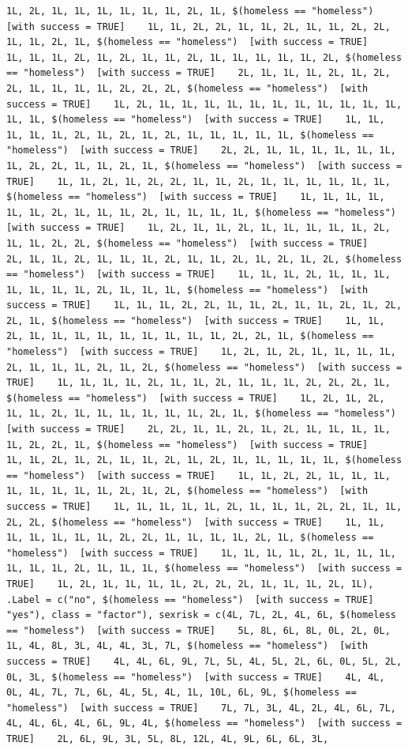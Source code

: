 \documentclass{tufte-book}\usepackage[]{graphicx}\usepackage[]{xcolor}
\makeatletter
\newenvironment{kframe}{%
 \def\at@end@of@kframe{}%
 \ifinner\ifhmode%
  \def\at@end@of@kframe{\end{minipage}}%
  \begin{minipage}{\columnwidth}%
 \fi\fi%
 \def\FrameCommand##1{\hskip\@totalleftmargin \hskip-\fboxsep
 \colorbox{shadecolor}{##1}\hskip-\fboxsep
     \hskip-\linewidth \hskip-\@totalleftmargin \hskip\columnwidth}%
 \MakeFramed {\advance\hsize-\width
   \@totalleftmargin\z@ \linewidth\hsize
   \@setminipage}}%
 {\par\unskip\endMakeFramed%
 \at@end@of@kframe}
\newenvironment{knitrout}{}{} %
\makeatother
\begin{document}
\begin{knitrout}
\begin{kframe}
\begin{verbatim}
1L, 2L, 1L, 1L, 1L, 1L, 1L, 1L, 2L, 1L, $(homeless == "homeless")  [with success = TRUE]    1L, 1L, 2L, 2L, 1L, 1L, 2L, 1L, 1L, 2L, 2L, 1L, 1L, 2L, 1L, $(homeless == "homeless")  [with success = TRUE]    1L, 1L, 1L, 2L, 1L, 2L, 1L, 1L, 2L, 1L, 1L, 1L, 1L, 1L, 2L, $(homeless == "homeless")  [with success = TRUE]    2L, 1L, 1L, 1L, 2L, 1L, 2L, 2L, 1L, 1L, 1L, 1L, 2L, 2L, 2L, $(homeless == "homeless")  [with success = TRUE]    1L, 2L, 1L, 1L, 1L, 1L, 1L, 1L, 1L, 1L, 1L, 1L, 1L, 1L, 1L, $(homeless == "homeless")  [with success = TRUE]    1L, 1L, 1L, 1L, 1L, 2L, 1L, 2L, 1L, 2L, 1L, 1L, 1L, 1L, 1L, $(homeless == "homeless")  [with success = TRUE]    2L, 2L, 1L, 1L, 1L, 1L, 1L, 1L, 1L, 2L, 2L, 1L, 1L, 2L, 1L, $(homeless == "homeless")  [with success = TRUE]    1L, 1L, 2L, 1L, 2L, 2L, 1L, 1L, 2L, 1L, 1L, 1L, 1L, 1L, 1L, $(homeless == "homeless")  [with success = TRUE]    1L, 1L, 1L, 1L, 1L, 1L, 2L, 1L, 1L, 1L, 2L, 1L, 1L, 1L, 1L, $(homeless == "homeless")  [with success = TRUE]    1L, 2L, 1L, 1L, 2L, 1L, 1L, 1L, 1L, 1L, 2L, 1L, 1L, 2L, 2L, $(homeless == "homeless")  [with success = TRUE]    2L, 1L, 1L, 2L, 1L, 1L, 1L, 2L, 1L, 1L, 2L, 1L, 2L, 1L, 2L, $(homeless == "homeless")  [with success = TRUE]    1L, 1L, 1L, 2L, 1L, 1L, 1L, 1L, 1L, 1L, 1L, 2L, 1L, 1L, 1L, $(homeless == "homeless")  [with success = TRUE]    1L, 1L, 1L, 2L, 2L, 1L, 1L, 2L, 1L, 1L, 2L, 1L, 2L, 2L, 1L, $(homeless == "homeless")  [with success = TRUE]    1L, 1L, 2L, 1L, 1L, 1L, 1L, 1L, 1L, 1L, 1L, 1L, 2L, 2L, 1L, $(homeless == "homeless")  [with success = TRUE]    1L, 2L, 1L, 2L, 1L, 1L, 1L, 1L, 2L, 1L, 1L, 1L, 2L, 1L, 2L, $(homeless == "homeless")  [with success = TRUE]    1L, 1L, 1L, 1L, 2L, 1L, 1L, 2L, 1L, 1L, 1L, 2L, 2L, 2L, 1L, $(homeless == "homeless")  [with success = TRUE]    1L, 2L, 1L, 2L, 1L, 1L, 2L, 1L, 1L, 1L, 1L, 1L, 1L, 2L, 1L, $(homeless == "homeless")  [with success = TRUE]    2L, 2L, 1L, 1L, 2L, 1L, 2L, 1L, 1L, 1L, 1L, 1L, 2L, 2L, 1L, $(homeless == "homeless")  [with success = TRUE]    1L, 1L, 2L, 1L, 2L, 1L, 1L, 2L, 1L, 2L, 1L, 1L, 1L, 1L, 1L, $(homeless == "homeless")  [with success = TRUE]    1L, 1L, 2L, 2L, 1L, 1L, 1L, 1L, 1L, 1L, 1L, 1L, 2L, 1L, 2L, $(homeless == "homeless")  [with success = TRUE]    1L, 1L, 1L, 1L, 1L, 2L, 1L, 1L, 1L, 2L, 2L, 1L, 1L, 2L, 2L, $(homeless == "homeless")  [with success = TRUE]    1L, 1L, 1L, 1L, 1L, 1L, 1L, 2L, 2L, 1L, 1L, 1L, 1L, 2L, 1L, $(homeless == "homeless")  [with success = TRUE]    1L, 1L, 1L, 1L, 2L, 1L, 1L, 1L, 1L, 1L, 1L, 2L, 1L, 1L, 1L, $(homeless == "homeless")  [with success = TRUE]    1L, 2L, 1L, 1L, 1L, 1L, 2L, 2L, 2L, 1L, 1L, 1L, 2L, 1L), .Label = c("no", $(homeless == "homeless")  [with success = TRUE]    "yes"), class = "factor"), sexrisk = c(4L, 7L, 2L, 4L, 6L, $(homeless == "homeless")  [with success = TRUE]    5L, 8L, 6L, 8L, 0L, 2L, 0L, 1L, 4L, 8L, 3L, 4L, 4L, 3L, 7L, $(homeless == "homeless")  [with success = TRUE]    4L, 4L, 6L, 9L, 7L, 5L, 4L, 5L, 2L, 6L, 0L, 5L, 2L, 0L, 3L, $(homeless == "homeless")  [with success = TRUE]    4L, 4L, 0L, 4L, 7L, 7L, 6L, 4L, 5L, 4L, 1L, 10L, 6L, 9L, $(homeless == "homeless")  [with success = TRUE]    7L, 7L, 3L, 4L, 2L, 4L, 6L, 7L, 4L, 4L, 6L, 4L, 6L, 9L, 4L, $(homeless == "homeless")  [with success = TRUE]    2L, 6L, 9L, 3L, 5L, 8L, 12L, 4L, 9L, 6L, 6L, 3L, 
\end{verbatim}
\end{kframe}
\end{knitrout}
\end{document}
